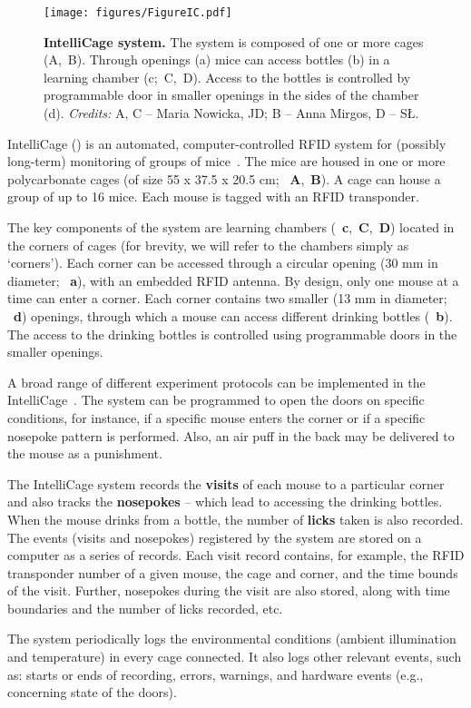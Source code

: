 
\begin{figure*}
  \texttt{[image: figures/FigureIC.pdf]}
  \caption{
    {\bf IntelliCage system.}
    The system is composed of one or more cages (A,~B).
    Through openings (a) mice can access bottles (b) in a learning chamber (c;~C,~D).
    Access to the bottles is controlled by programmable door in smaller openings in the sides
    of the chamber (d). \emph{Credits:} A, C -- Maria Nowicka, JD; B -- Anna Mirgos, D -- SŁ.
  }
  \label{intellicageSystem}
\end{figure*}

IntelliCage () is an automated, computer-controlled RFID system for
(possibly long-term) monitoring of groups of
mice~\cite{Galsworthy:2005br,Krackow:2010ck,Puscian:2014cu}. The mice are housed in
one or more polycarbonate cages (of size 55 x 37.5 x 20.5 cm;
~\textbf{A},~\textbf{B}). A cage can house a group of up to
16 mice. Each mouse is tagged with an RFID transponder.

The key components of the system are learning chambers
(~\textbf{c},~\textbf{C},~\textbf{D})
located in the corners of cages
(for brevity, we will refer to the chambers simply as `corners'). Each
corner can be accessed through a circular opening (30 mm in diameter; ~\textbf{a}),
with an embedded RFID antenna. By design, only one mouse at a time can enter
a corner. Each corner contains two smaller (13 mm in diameter; ~\textbf{d}) openings,
through which a mouse can access different drinking bottles (~\textbf{b}). The access to the
drinking bottles is controlled using programmable doors in
the smaller openings.


A broad range of different experiment protocols can be implemented in the
IntelliCage~\cite{Knapska:2006cz,Kiryk:2011tk,Endo:2011bs,Radwanska:2012fd,Knapska:2013dj,Smutek:2014da,Puscian:2014cu,Vannoni:2014jt}.
The system can be programmed to open the doors on specific conditions, for
instance, if a specific mouse enters the corner or if a specific nosepoke
pattern is performed. Also, an air puff in the back may be delivered to the
mouse as a punishment.

The IntelliCage system records the \textbf{visits} of
each mouse to a particular corner and also tracks the \textbf{nosepokes}
-- which lead to accessing the drinking bottles. When the mouse drinks
from a bottle, the number of \textbf{licks} taken is also recorded.
The events (visits and nosepokes) registered by the system are stored on a
computer as a series of records. Each visit record contains, for example,
the RFID transponder number of a given mouse, the cage and corner,
and the time bounds of the visit. Further,
nosepokes during the visit are also stored, along with
time boundaries and the number of licks recorded, etc.

The system periodically logs the environmental conditions (ambient
illumination and temperature) in every cage connected. It also logs other
relevant events, such as: starts or ends of recording, errors, warnings, and
hardware events (e.g., concerning state of the doors).
